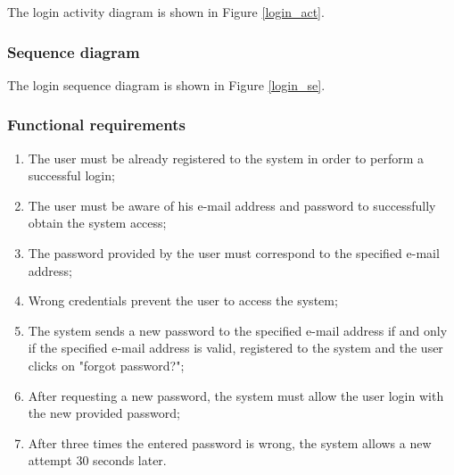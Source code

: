 The login activity diagram is shown in Figure \ref{login_act}.

\subsubsection{Sequence diagram}

The login sequence diagram is shown in Figure \ref{login_se}.

\subsubsection{Functional requirements}
\begin{enumerate}
\item The user must be already registered to the system in order to perform a successful login;
\item The user must be aware of his e-mail address and password to successfully obtain the system access;
\item The password provided by the user must correspond to the specified e-mail address;
\item Wrong credentials prevent the user to access the system;
\item The system sends a new password to the specified e-mail address if and only if the specified e-mail address is valid, registered to the system and the user clicks on "forgot password?";
\item After requesting a new password, the system must allow the user login with the new provided password;
\item After three times the entered password is wrong, the system allows a new attempt 30 seconds later.
\end{enumerate}


